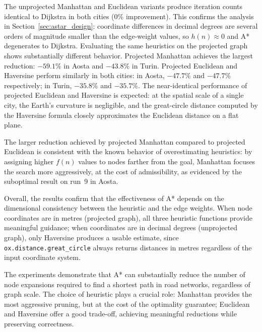 \documentclass[12pt,a4paper]{article}
\begin{document}
The unprojected Manhattan and Euclidean variants produce iteration counts identical to Dijkstra in both cities (0\% improvement).
This confirms the analysis in Section~\ref{sec:astar_design}: coordinate differences in decimal degrees are several orders of magnitude smaller than the edge-weight values, so $h(n) \approx 0$ and A* degenerates to Dijkstra.
Evaluating the same heuristics on the projected graph shows substantially different behavior.
Projected Manhattan achieves the largest reduction: $-59.1\%$ in Aosta and $-43.8\%$ in Turin.
Projected Euclidean and Haversine perform similarly in both cities: in Aosta, $-47.7\%$ and $-47.7\%$ respectively; in Turin, $-35.8\%$  and $-35.7\%$.
The near-identical performance of projected Euclidean and Haversine is expected: at the spatial scale of a single city, the Earth's curvature is negligible, and the great-circle distance computed by the Haversine formula closely approximates the Euclidean distance on a flat plane.

The larger reduction achieved by projected Manhattan compared to projected Euclidean is consistent with the known behavior of overestimating heuristics: by assigning higher $f(n)$ values to nodes farther from the goal, Manhattan focuses the search more aggressively, at the cost of admissibility, as evidenced by the suboptimal result on run~9 in Aosta.

Overall, the results confirm that the effectiveness of A* depends on the dimensional consistency between the heuristic and the edge weights.
When node coordinates are in metres (projected graph), all three heuristic functions provide meaningful guidance; when coordinates are in decimal degrees (unprojected graph), only Haversine produces a usable estimate, since \texttt{ox.distance.great\_circle} always returns distances in metres regardless of the input coordinate system.

The experiments demonstrate that A* can substantially reduce the number of node expansions required to find a shortest path in road networks, regardless of graph scale.
The choice of heuristic plays a crucial role: Manhattan provides the most aggressive pruning, but at the cost of the optimality guarantee; Euclidean and Haversine offer a good trade-off, achieving meaningful reductions while preserving correctness.

\end{document}
